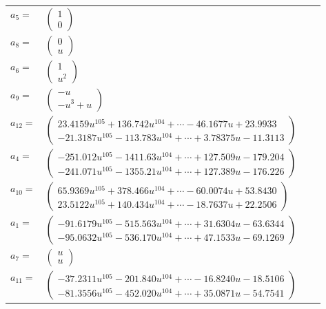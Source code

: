 \documentclass[1p]{elsarticle_modified}
\theoremstyle{definition}
\begin{document}
\begin{tabular}{m{7pt} m{180pt} m{7pt} m{180pt} }
\flushright $a_{5}=$&$\begin{pmatrix}1\\0\end{pmatrix}$ \\
\flushright $a_{8}=$&$\begin{pmatrix}0\\u\end{pmatrix}$ \\
\flushright $a_{6}=$&$\begin{pmatrix}1\\u^2\end{pmatrix}$ \\
\flushright $a_{9}=$&$\begin{pmatrix}- u\\- u^3+u\end{pmatrix}$ \\
\flushright $a_{12}=$&$\begin{pmatrix}23.4159 u^{105}+136.742 u^{104}+\cdots-46.1677 u+23.9933\\-21.3187 u^{105}-113.783 u^{104}+\cdots+3.78375 u-11.3113\end{pmatrix}$ \\
\flushright $a_{4}=$&$\begin{pmatrix}-251.012 u^{105}-1411.63 u^{104}+\cdots+127.509 u-179.204\\-241.071 u^{105}-1355.21 u^{104}+\cdots+127.389 u-176.226\end{pmatrix}$ \\
\flushright $a_{10}=$&$\begin{pmatrix}65.9369 u^{105}+378.466 u^{104}+\cdots-60.0074 u+53.8430\\23.5122 u^{105}+140.434 u^{104}+\cdots-18.7637 u+22.2506\end{pmatrix}$ \\
\flushright $a_{1}=$&$\begin{pmatrix}-91.6179 u^{105}-515.563 u^{104}+\cdots+31.6304 u-63.6344\\-95.0632 u^{105}-536.170 u^{104}+\cdots+47.1533 u-69.1269\end{pmatrix}$ \\
\flushright $a_{7}=$&$\begin{pmatrix}u\\u\end{pmatrix}$ \\
\flushright $a_{11}=$&$\begin{pmatrix}-37.2311 u^{105}-201.840 u^{104}+\cdots-16.8240 u-18.5106\\-81.3556 u^{105}-452.020 u^{104}+\cdots+35.0871 u-54.7541\end{pmatrix}$ \\

\end{tabular}
\end{document}

